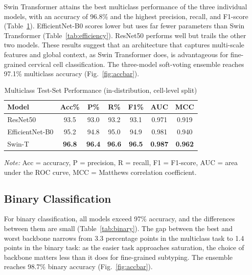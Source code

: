\documentclass[runningheads]{llncs}
\begin{document}
Swin Transformer attains the best multiclass performance of the three individual models, with an accuracy of 96.8\% and the highest precision, recall, and F1-score (Table~\ref{tab:multiclass}). EfficientNet-B0 scores lower but uses far fewer parameters than Swin Transformer (Table~\ref{tab:efficiency}). ResNet50 performs well but trails the other two models. These results suggest that an architecture that captures multi-scale features and global context, as Swin Transformer does, is advantageous for fine-grained cervical cell classification. The three-model soft-voting ensemble reaches 97.1\% multiclass accuracy (Fig.~\ref{fig:accbar}).

\begin{table}[t]
\caption{Multiclass Test-Set Performance (in-distribution, cell-level split)}
\label{tab:multiclass}
\centering
\setlength{\tabcolsep}{3.5pt}
\begin{tabular}{lcccccc}
\toprule
\textbf{Model} & \textbf{Acc\%} & \textbf{P\%} & \textbf{R\%} & \textbf{F1\%} & \textbf{AUC} & \textbf{MCC}\\
\midrule
ResNet50        & 93.5 & 93.0 & 93.2 & 93.1 & 0.971 & 0.919\\
EfficientNet-B0 & 95.2 & 94.8 & 95.0 & 94.9 & 0.981 & 0.940\\
Swin-T          & \textbf{96.8} & \textbf{96.4} & \textbf{96.6} & \textbf{96.5} & \textbf{0.987} & \textbf{0.962}\\
\bottomrule
\end{tabular}
\begin{flushleft}
\footnotesize \textit{Note:} Acc = accuracy, P = precision, R = recall, F1 = F1-score, AUC = area under the ROC curve, MCC = Matthews correlation coefficient.
\end{flushleft}
\end{table}

\subsection{Binary Classification}

For binary classification, all models exceed 97\% accuracy, and the differences between them are small (Table~\ref{tab:binary}). The gap between the best and worst backbone narrows from 3.3 percentage points in the multiclass task to 1.4 points in the binary task: as the easier task approaches saturation, the choice of backbone matters less than it does for fine-grained subtyping. The ensemble reaches 98.7\% binary accuracy (Fig.~\ref{fig:accbar}).
\end{document}

